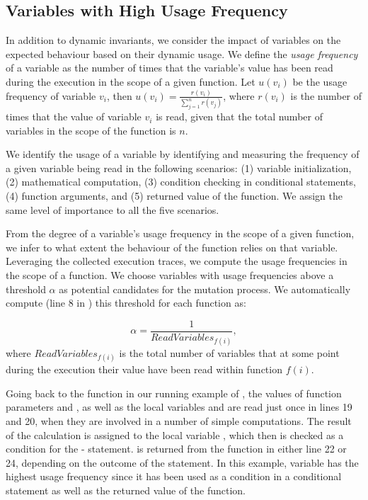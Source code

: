 \subsection{Variables with High Usage Frequency} 
In addition to dynamic invariants, we  consider the impact of variables on the expected behaviour based on their dynamic usage. %
We define the {\em usage frequency} of a variable as the number of times that the variable's value has been read during the execution in the scope of a given function. 
Let $u(v_i)$ be the usage frequency of variable $v_i$, then $u(v_i)=\frac{r(v_i)}{\sum _{j=1}^{n} r(v_j)}$,  
where $r(v_i)$ is the number of times that the value of variable $v_i$ is read, given that the total number of variables in the scope of the function is $n$.

We identify the usage of a variable by identifying and measuring the frequency of a given variable being read in the following
scenarios: (1) variable initialization, (2) mathematical computation, (3) condition checking in conditional statements, (4) function arguments, and (5) returned value of the function. 
We assign the same level of importance to all the five scenarios. 
     
From the degree of a variable's usage frequency in the scope of a given function, we infer to what extent
the behaviour of the function relies on that variable. Leveraging the collected execution traces, 
we compute the usage frequencies in the scope of a function. 
We choose variables with usage frequencies above a threshold $\alpha$ as potential candidates for the mutation process. 
We automatically compute (line 8 in ) this threshold for each function as:

\begin{equation}
\alpha = \frac{1}{ReadVariables_{f(i)}}, 
\end{equation}
where $ReadVariables_{f(i)}$ is 
the total number of variables that at some point during the execution their value have been read within function $f(i)$.

Going back to the  function in our running example of , the values of function parameters  and , as well as the local variables  and  are read just once in lines 19 and 20, when they are involved in a  number of simple computations.
The result of the calculation is assigned to the local variable , which then is checked as a condition for the - statement.  is returned from the function in either line 22 or 24,
depending on the outcome of the  statement.
In this example, variable  has the highest usage frequency since it has been used as a condition in a conditional statement as
well as the returned value of the  function.

